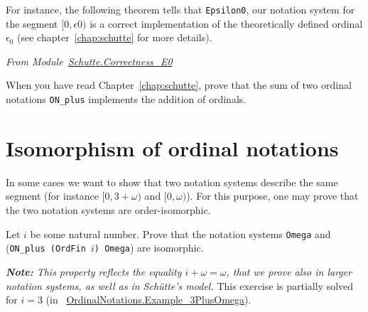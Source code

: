 


For instance, the following theorem tells that \texttt{Epsilon0}, our notation system for the segment $[0,\epsilon0)$ is a correct implementation of the theoretically defined  ordinal $\epsilon_0$
(see chapter~\ref{chap:schutte} for more details).

\vspace{4pt}
\noindent\emph{From Module~\href{../theories/html/hydras.Schutte.Correctness_E0.html}{Schutte.Correctness\_E0}}






\begin{project}
  When you have read Chapter~\ref{chap:schutte}, prove that the sum of two ordinal notations \texttt{ON\_plus} implements the addition of ordinals.
\end{project}





\section{Isomorphism of ordinal notations}


In some cases we want to show that two notation systems describe the same segment (for instance $[0,3+\omega)$ and $[0,\omega)$\;). For this purpose, one may prove that the two notation systems are order-isomorphic.


\label{types:ON-iso} 






\begin{exercise}
\label{exo:i-plus-omega}
Let $i$ be some natural number. Prove that the notation systems 
\texttt{Omega} and (\texttt{ON\_plus (OrdFin $i$) Omega}) are isomorphic.

{\it \textbf{Note:} This property reflects the equality $i+\omega=\omega$, that we prove also in larger notation systems, as well as in Schütte's model.}
This exercise is partially solved for $i=3$ (in ~\href{../theories/html/hydras.OrdinalNotations.Example_3PlusOmega.html}{OrdinalNotations.Example\_3PlusOmega}).

\end{exercise}

